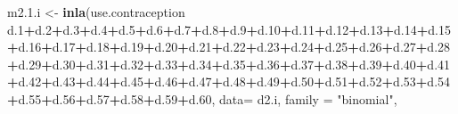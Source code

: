 \documentclass[
]{article}
\newenvironment{Shaded}{\begin{snugshade}}{\end{snugshade}}
\newcommand{\DataTypeTok}[1]{\textcolor[rgb]{0.13,0.29,0.53}{#1}}
\newcommand{\FloatTok}[1]{\textcolor[rgb]{0.00,0.00,0.81}{#1}}
\newcommand{\KeywordTok}[1]{\textcolor[rgb]{0.13,0.29,0.53}{\textbf{#1}}}
\newcommand{\NormalTok}[1]{#1}
\newcommand{\OperatorTok}[1]{\textcolor[rgb]{0.81,0.36,0.00}{\textbf{#1}}}
\newcommand{\StringTok}[1]{\textcolor[rgb]{0.31,0.60,0.02}{#1}}
\begin{document}
\begin{Shaded}
\begin{Highlighting}[]
{{\NormalTok{m2.}\FloatTok{1.}\NormalTok{i <-}\StringTok{ }\KeywordTok{inla}\NormalTok{(use.contraception }\OperatorTok{~}\StringTok{ }\NormalTok{d}\FloatTok{.1}\OperatorTok{+}\NormalTok{d}\FloatTok{.2}\OperatorTok{+}\NormalTok{d}\FloatTok{.3}\OperatorTok{+}\NormalTok{d}\FloatTok{.4}\OperatorTok{+}\NormalTok{d}\FloatTok{.5}\OperatorTok{+}\NormalTok{d}\FloatTok{.6}\OperatorTok{+}\NormalTok{d}\FloatTok{.7}\OperatorTok{+}\NormalTok{d}\FloatTok{.8}\OperatorTok{+}\NormalTok{d}\FloatTok{.9}\OperatorTok{+}\NormalTok{d}\FloatTok{.10}\OperatorTok{+}\NormalTok{d}\FloatTok{.11}\OperatorTok{+}\NormalTok{d}\FloatTok{.12}\OperatorTok{+}\NormalTok{d}\FloatTok{.13}\OperatorTok{+}\NormalTok{d}\FloatTok{.14}\OperatorTok{+}\NormalTok{d}\FloatTok{.15}\OperatorTok{+}\NormalTok{d}\FloatTok{.16}\OperatorTok{+}\NormalTok{d}\FloatTok{.17}\OperatorTok{+}\NormalTok{d}\FloatTok{.18}\OperatorTok{+}\NormalTok{d}\FloatTok{.19}\OperatorTok{+}\NormalTok{d}\FloatTok{.20}\OperatorTok{+}\NormalTok{d}\FloatTok{.21}\OperatorTok{+}\NormalTok{d}\FloatTok{.22}\OperatorTok{+}\NormalTok{d}\FloatTok{.23}\OperatorTok{+}\NormalTok{d}\FloatTok{.24}\OperatorTok{+}\NormalTok{d}\FloatTok{.25}\OperatorTok{+}\NormalTok{d}\FloatTok{.26}\OperatorTok{+}\NormalTok{d}\FloatTok{.27}\OperatorTok{+}\NormalTok{d}\FloatTok{.28}\OperatorTok{+}\NormalTok{d}\FloatTok{.29}\OperatorTok{+}\NormalTok{d}\FloatTok{.30}\OperatorTok{+}\NormalTok{d}\FloatTok{.31}\OperatorTok{+}\NormalTok{d}\FloatTok{.32}\OperatorTok{+}\NormalTok{d}\FloatTok{.33}\OperatorTok{+}\NormalTok{d}\FloatTok{.34}\OperatorTok{+}\NormalTok{d}\FloatTok{.35}\OperatorTok{+}\NormalTok{d}\FloatTok{.36}\OperatorTok{+}\NormalTok{d}\FloatTok{.37}\OperatorTok{+}\NormalTok{d}\FloatTok{.38}\OperatorTok{+}\NormalTok{d}\FloatTok{.39}\OperatorTok{+}\NormalTok{d}\FloatTok{.40}\OperatorTok{+}\NormalTok{d}\FloatTok{.41}\OperatorTok{+}\NormalTok{d}\FloatTok{.42}\OperatorTok{+}\NormalTok{d}\FloatTok{.43}\OperatorTok{+}\NormalTok{d}\FloatTok{.44}\OperatorTok{+}\NormalTok{d}\FloatTok{.45}\OperatorTok{+}\NormalTok{d}\FloatTok{.46}\OperatorTok{+}\NormalTok{d}\FloatTok{.47}\OperatorTok{+}\NormalTok{d}\FloatTok{.48}\OperatorTok{+}\NormalTok{d}\FloatTok{.49}\OperatorTok{+}\NormalTok{d}\FloatTok{.50}\OperatorTok{+}\NormalTok{d}\FloatTok{.51}\OperatorTok{+}\NormalTok{d}\FloatTok{.52}\OperatorTok{+}\NormalTok{d}\FloatTok{.53}\OperatorTok{+}\NormalTok{d}\FloatTok{.54}\OperatorTok{+}\NormalTok{d}\FloatTok{.55}\OperatorTok{+}\NormalTok{d}\FloatTok{.56}\OperatorTok{+}\NormalTok{d}\FloatTok{.57}\OperatorTok{+}\NormalTok{d}\FloatTok{.58}\OperatorTok{+}\NormalTok{d}\FloatTok{.59}\OperatorTok{+}\NormalTok{d}\FloatTok{.60}\NormalTok{, }\DataTypeTok{data=}\NormalTok{ d2.i, }\DataTypeTok{family =} \StringTok{"binomial"}\NormalTok{, }
}}
\end{Highlighting}
\end{Shaded}
\end{document}

